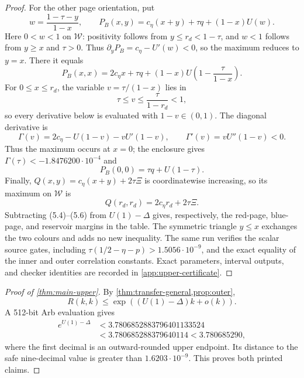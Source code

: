 \begin{proof}
For the other page orientation, put
\[
 w=\frac{1-\tau-y}{1-x},\qquad
 P_B(x,y)=c_\eta(x+y)+\tau q+(1-x)U(w).
\]
Here \(0<w<1\) on \(\mathcal W\): positivity follows from
\(y\le r_d<1-\tau\), and \(w<1\) follows from \(y\ge x\) and \(\tau>0\).
Thus \(\partial_yP_B=c_\eta-U'(w)<0\), so the maximum reduces to \(y=x\).
There it equals
\[
 P_B(x,x)=2c_\eta x+\tau q
 +(1-x)U\!\left(1-\frac{\tau}{1-x}\right).
\]
For \(0\le x\le r_d\), the variable \(v=\tau/(1-x)\) lies in
\[
 \tau\le v\le\frac{\tau}{1-r_d}<1,
\]
so every derivative below is evaluated with \(1-v\in(0,1)\).  The diagonal
derivative is
\[
 \Gamma(v)=2c_\eta-U(1-v)-vU'(1-v),
 \qquad \Gamma'(v)=vU''(1-v)<0.
\]
Thus the maximum occurs at \(x=0\); the enclosure gives
\(\Gamma(\tau)<-1.8476200\cdot10^{-4}\) and
\[
 P_B(0,0)=\tau q+U(1-\tau).                 \tag{5.5}
\]
Finally, \(Q(x,y)=c_\eta(x+y)+2\tau\Xi\) is coordinatewise increasing, so
its maximum on \(\mathcal W\) is
\[
 Q(r_d,r_d)=2c_\eta r_d+2\tau\Xi.          \tag{5.6}
\]
Subtracting (5.4)--(5.6) from \(U(1)-\Delta\) gives, respectively, the
red-page, blue-page, and reservoir margins in the table.  The symmetric
triangle \(y\le x\) exchanges the two colours and adds no new inequality.
The same run verifies the scalar source gates, including
\(\tau(1/2-\eta-p)>1.5056\cdot10^{-9}\), and the exact equality of the
inner and outer correlation constants.  Exact parameters, interval outputs,
and checker identities are recorded in \cref{app:upper-certificate}.
\end{proof}

\begin{proof}[Proof of \cref{thm:main-upper}]
By \cref{thm:transfer-general,prop:outer},
\[
 R(k,k)\le \exp((U(1)-\Delta)k+o(k)).
\]
A 512-bit Arb evaluation gives
\[
\begin{aligned}
 e^{U(1)-\Delta}
 &<3.7806852883796401133524\\
 &<3.780685288379640114<3.780685290,
\end{aligned}
\]
where the first decimal is an outward-rounded upper endpoint.  Its distance
to the safe nine-decimal value is greater than
\(1.6203\cdot10^{-9}\).  This proves both printed claims.
\end{proof}
